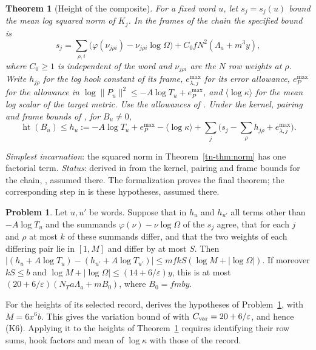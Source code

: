 \documentclass[reqno]{amsart}
\theoremstyle{definition}
\newtheorem{problem}{Problem}[section]
\theoremstyle{plain}
\newtheorem{theorem}{Theorem}[section]
\newcommand{\htop}{\operatorname{ht}}
\begin{document}
\begin{theorem}[Height of the composite]\label{in:height}
For a fixed word $u$, let $s_j=s_j(u)$ bound the mean log squared norm of $K_j$.  In the frames of the
chain the specified bound is
\[
 s_j=\sum_{\rho,i}\bigl(\varphi(\nu_{j\rho i})-
                  \nu_{j\rho i}\log\Omega\bigr)
       + C_0fN^2(\Lambda_a+m^3y),
\]
where $C_0\ge1$ is independent of the word and $\nu_{j\rho i}$ are the $N$ row weights at $\rho$.
Write $h_{j\rho}$ for the log hook constant of its frame,
$e_{\lambda,j}^{\max}$ for its error allowance, $e_P^{\max}$ for
the allowance in $\log\|P_u\|^2\le-A\log T_u+e_P^{\max}$,
and $\langle\log\kappa\rangle$ for the mean log scalar of the target
metric.  Use the allowances of \cite[Def.~15.14]{Adr}.  Under the kernel, pairing and frame bounds of
\cite[Hyps.~15.10--15.12]{Adr}, for $B_u\ne0$,
\[
 \htop(B_u)\le h_u:=-A\log T_u+e_P^{\max}-\langle\log\kappa\rangle
       +\sum_j\bigl(s_j-\sum_\rho h_{j\rho}+e_{\lambda,j}^{\max}\bigr).
\]
\end{theorem}
\noindent\emph{Simplest incarnation}: the squared norm in Theorem~\ref{tn-thm:norm}
has one factorial term.  \emph{Status}: derived in
\cite[Prop.~15.9, Cor.~15.15]{Adr} from the kernel, pairing and frame
bounds for the chain, \cite[Hyps.~15.10--15.12]{Adr}, assumed there.
The formalization \cite{Lean} proves the final theorem; the corresponding
step in \cite{Adr} is these hypotheses, assumed there.

\begin{problem}\label{pr:common-height}
Let $u,u'$ be words.  Suppose that in $h_u$ and $h_{u'}$ all terms other
than $-A\log T_u$ and the summands $\varphi(\nu)-\nu\log\Omega$ of the
$s_j$ agree, that for each $j$ and $\rho$ at most $k$ of these summands
differ, and that the two weights of each differing pair lie in $[1,M]$
and differ by at most $S$.  Then
$|(h_u+A\log T_u)-(h_{u'}+A\log T_{u'})|\le mfkS(\log M+|\log\Omega|)$.
If moreover $kS\le b$ and $\log M+|\log\Omega|\le(14+6/\varepsilon)y$,
this is at most $(20+6/\varepsilon)(N_Ta\Lambda_a+mB_0)$, where $B_0=fmby$.
\end{problem}

For the heights of its selected record, \cite[\S18.7, The height at one index]{Adr}
derives the hypotheses of Problem~\ref{pr:common-height}, with $M=6x^6b$.
This gives the variation bound of \cite[Prop.~18.11(vi)]{Adr} with
$C_{\rm var}=20+6/\varepsilon$, and hence (K6).  Applying it to the heights
of Theorem~\ref{in:height} requires identifying their row sums, hook
factors and mean of $\log\kappa$ with those of the record.
\end{document}
